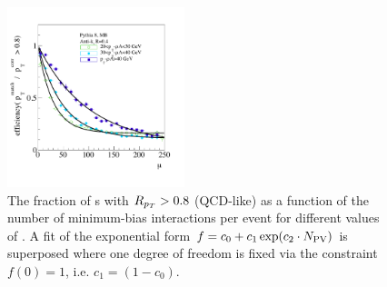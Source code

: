 
\begin{figure}[htbp!]
  \begin{center} 
    \includegraphics[width=0.46\textwidth]{20130710_frac_rpt_gt_0p8_vs_NPV_restricted_new.pdf}
    \caption[]{The fraction of \pujet s with $R_{p_T} > 0.8$ (QCD-like) as a function of the number of minimum-bias interactions  
    per event for different values of \ptcorr. A fit of the exponential form $f=c_0+c_1\exp(c_2\cdot N_{\rm PV})$ is superposed
    where one degree of freedom is fixed via the constraint $f(0)=1$, i.e. $c_1=(1-c_0)$.}
    \label{fig:FractionOfQCDlikePUjets}
  \end{center}
\end{figure}



